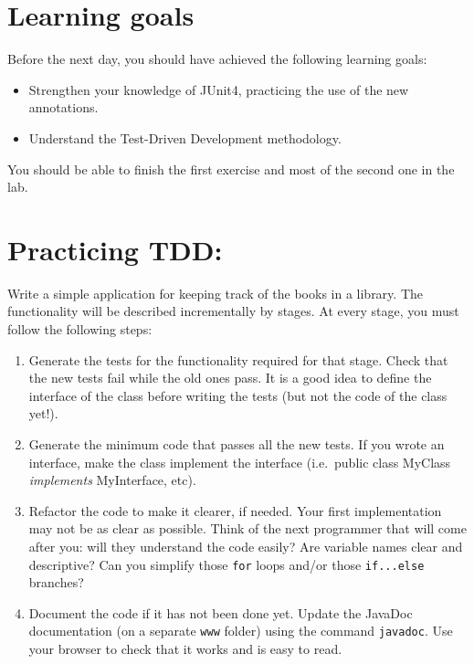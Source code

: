 \documentclass{article}
\begin{document}
\section*{Learning goals}
\label{sec:learning-goals}

Before the next day, you should have achieved the following learning
goals: 

\begin{itemize}
\item Strengthen your knowledge of JUnit4, practicing the use of the
  new annotations.
\item Understand the Test-Driven Development methodology. 
\end{itemize}

You should be able to finish the first exercise and most of the second
one in the lab.

\section{Practicing TDD: }
\label{sec:jj}

Write a simple application for keeping track of the books in a
library. The functionality will be described incrementally by
stages. At every stage, you must follow the following steps:

\begin{enumerate}
\item Generate the tests for the functionality required for that
  stage. Check that the new tests fail while the old ones pass. It is
  a good idea to define the interface of the class before writing the
  tests (but not the code of the class yet!). 
\item Generate the minimum code that passes all the new tests. If you
  wrote an interface, make the class implement the interface
  (i.e.~public class MyClass \emph{implements} MyInterface, etc). 
\item Refactor the code to make it clearer, if needed. Your first
  implementation may not be as clear as possible. Think of the next
  programmer that will come after you: will they understand the code
  easily? Are variable names clear and descriptive? Can you simplify
  those \verb+for+ loops and/or those \verb+if...else+ branches?
\item Document the
  code if it has not been done yet. Update the JavaDoc documentation
  (on a separate \verb+www+ folder) using the command
  \verb+javadoc+. Use your browser to check that it works and is easy
  to read. 
\end{enumerate}
\end{document}
